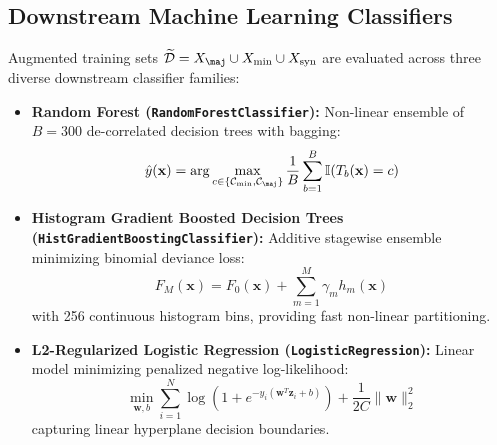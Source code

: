 \documentclass[sn-basic]{sn-jnl}
\begin{document}
\subsection{Downstream Machine Learning Classifiers}
\label{subsec:classifiers}
Augmented training sets $\widetilde{\mathcal{D}} = X_{\maj} \cup X_{\min} \cup X_{\text{syn}}$ are evaluated across three diverse downstream classifier families:
\begin{itemize}
    \item \textbf{Random Forest (\texttt{RandomForestClassifier}):} Non-linear ensemble of $B=300$ de-correlated decision trees with bagging:
    \begin{equation}
    \label{eq:random_forest}
    \hat{y}(\mathbf{x}) = \arg\max_{c \in \{\mathcal{C}_{\min}, \mathcal{C}_{\maj}\}} \frac{1}{B} \sum_{b=1}^B \mathbb{I}(T_b(\mathbf{x}) = c)
    \end{equation}
    \item \textbf{Histogram Gradient Boosted Decision Trees (\texttt{HistGradientBoostingClassifier}):} Additive stagewise ensemble minimizing binomial deviance loss:
    \begin{equation}
    \label{eq:gradient_boosting}
    F_M(\mathbf{x}) = F_0(\mathbf{x}) + \sum_{m=1}^M \gamma_m h_m(\mathbf{x})
    \end{equation}
    with 256 continuous histogram bins, providing fast non-linear partitioning.
    \item \textbf{L2-Regularized Logistic Regression (\texttt{LogisticRegression}):} Linear model minimizing penalized negative log-likelihood:
    \begin{equation}
    \label{eq:logistic_regression}
    \min_{\mathbf{w}, b} \sum_{i=1}^{N} \log \left(1 + e^{-y_i (\mathbf{w}^T \mathbf{z}_i + b)}\right) + \frac{1}{2C} \|\mathbf{w}\|_2^2
    \end{equation}
    capturing linear hyperplane decision boundaries.
\end{itemize}
\end{document}
